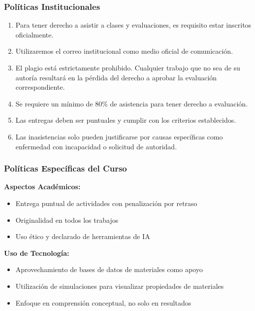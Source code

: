 \documentclass{beamer}
\begin{document}
\begin{frame}
	\frametitle{Políticas Institucionales}
	\begin{enumerate}
		\item Para tener derecho a asistir a clases y evaluaciones, es requisito estar inscritos oficialmente.
		\item Utilizaremos el correo institucional como medio oficial de comunicación.
		\item El plagio está estrictamente prohibido. Cualquier trabajo que no sea de su autoría resultará en la pérdida del derecho a aprobar la evaluación correspondiente.
		\item Se requiere un mínimo de 80\% de asistencia para tener derecho a evaluación.
		\item Las entregas deben ser puntuales y cumplir con los criterios establecidos.
		\item Las inasistencias solo pueden justificarse por causas específicas como enfermedad con incapacidad o solicitud de autoridad.
	\end{enumerate}

\end{frame}	

\begin{frame}
	\frametitle{Políticas Específicas del Curso}
	
	\textbf{Aspectos Académicos:}
	
	\begin{itemize}
		\item Entrega puntual de actividades con penalización por retraso
		\item Originalidad en todos los trabajos
		\item Uso ético y declarado de herramientas de IA
	\end{itemize}

	\textbf{Uso de Tecnología:}
	
	\begin{itemize}
		\item Aprovechamiento de bases de datos de materiales como apoyo
		\item Utilización de simulaciones para visualizar propiedades de materiales
		\item Enfoque en comprensión conceptual, no solo en resultados
	\end{itemize}
	
\end{frame}
\end{document}
